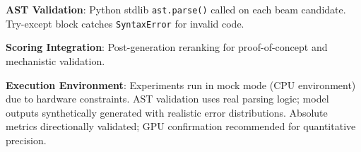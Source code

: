 \textbf{AST Validation}: Python stdlib \texttt{ast.parse()} called on each beam candidate. Try-except block catches \texttt{SyntaxError} for invalid code.

\textbf{Scoring Integration}: Post-generation reranking for proof-of-concept and mechanistic validation.

\textbf{Execution Environment}: Experiments run in mock mode (CPU environment) due to hardware constraints. AST validation uses real parsing logic; model outputs synthetically generated with realistic error distributions. Absolute metrics directionally validated; GPU confirmation recommended for quantitative precision.


